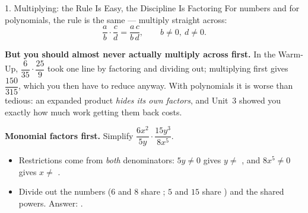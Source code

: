 \documentclass[10pt]{article}
\begin{document}
\begin{notesbox}{1. Multiplying: the Rule Is Easy, the Discipline Is Factoring}
For numbers and for polynomials, the rule is the same --- multiply straight across:
\[
  \frac{a}{b}\cdot\frac{c}{d}=\frac{a\,c}{b\,d}, \qquad b\neq0,\ d\neq0 .
\]

\vspace{3pt}
\textbf{But you should almost never actually multiply across first.} In the Warm-Up,
$\dfrac{6}{35}\cdot\dfrac{25}{9}$ took one line by factoring and dividing out; multiplying first gives
$\dfrac{150}{315}$, which you then have to reduce anyway. With polynomials it is worse than tedious:
an expanded product \emph{hides its own factors}, and Unit~3 showed you exactly how much work getting
them back costs.

\vspace{3pt}
\begin{center}
\end{center}

\vspace{4pt}
\textbf{Monomial factors first.} Simplify $\dfrac{6x^2}{5y}\cdot\dfrac{15y^3}{8x^5}$.
\begin{itemize}[leftmargin=1.5em, itemsep=3pt]
  \item Restrictions come from \emph{both} denominators: $5y\neq0$ gives $y\neq$ \blank{0.8cm}, and
        $8x^5\neq0$ gives $x\neq$ \blank{0.8cm}.
  \item Divide out the numbers ($6$ and $8$ share \blank{0.8cm}; $5$ and $15$ share \blank{0.8cm})
        and the shared powers. Answer: \blank{2.6cm}.
\end{itemize}
\end{notesbox}
\end{document}
